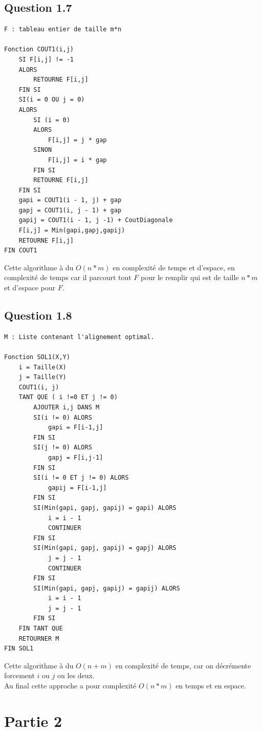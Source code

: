 \documentclass[5pt,a4paper]{report}
\begin{document}
	\subsection*{Question 1.7}
	\begin{lstlisting}
F : tableau entier de taille m*n

Fonction COUT1(i,j)
	SI F[i,j] != -1
	ALORS
		RETOURNE F[i,j]
	FIN SI
	SI(i = 0 OU j = 0)
	ALORS
		SI (i = 0)
		ALORS
			F[i,j] = j * gap
		SINON
			F[i,j] = i * gap
		FIN SI
		RETOURNE F[i,j]
	FIN SI
	gapi = COUT1(i - 1, j) + gap
	gapj = COUT1(i, j - 1) + gap
	gapij = COUT1(i - 1, j -1) + CoutDiagonale
	F[i,j] = Min(gapi,gapj,gapij)
	RETOURNE F[i,j]
FIN COUT1
	\end{lstlisting}
	Cette algorithme à du $O(n * m)$ en complexité de temps et d'espace, en complexité de 
	temps car il parcourt tout $F$ pour le remplir qui est de taille $n*m$ et d'espace pour $F$.
	
	\subsection*{Question 1.8}
	\begin{lstlisting}
M : Liste contenant l'alignement optimal.

Fonction SOL1(X,Y)
	i = Taille(X)
	j = Taille(Y)
	COUT1(i, j)
	TANT QUE ( i !=0 ET j != 0)
		AJOUTER i,j DANS M
		SI(i != 0) ALORS
			gapi = F[i-1,j]
		FIN SI
		SI(j != 0) ALORS
			gapj = F[i,j-1]
		FIN SI
		SI(i != 0 ET j != 0) ALORS
			gapij = F[i-1,j]
		FIN SI
		SI(Min(gapi, gapj, gapij) = gapi) ALORS
			i = i - 1
			CONTINUER
		FIN SI
		SI(Min(gapi, gapj, gapij) = gapj) ALORS
			j = j - 1
			CONTINUER
		FIN SI
		SI(Min(gapi, gapj, gapij) = gapij) ALORS
			i = i - 1
			j = j - 1
		FIN SI
	FIN TANT QUE
	RETOURNER M
FIN SOL1
	\end{lstlisting}
	Cette algorithme à du $O(n + m)$ en complexité de temps, car on décrémente forcement $i$ ou $j$ ou les deux.\\
	Au final cette approche a pour complexité $O(n * m)$ en temps et en espace.
	\section*{Partie 2}
\end{document}
